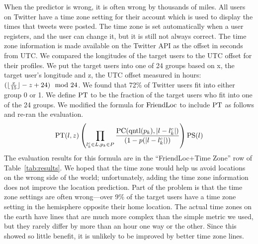 
\ifdefined\THESIS
{}
When the predictor is wrong, it is often wrong by thousands of miles.
%
All users on Twitter have a time zone setting for their account which is used
to display the times that tweets were posted.
%
The time zone is set automatically when a user registers, and the user can
change it, but it is still not always correct.
%
The time zone information is made available on the Twitter API as the offset
in seconds from UTC.
%
We compared the longitudes of the target users to the UTC offset for their
profiles.
%
We put the target users into one of 24 groups based on x, the target user's
longitude and z, the UTC offset measured in hours:
${(\lfloor {x\over15}\rfloor-z+24)\mod{24}}$.
%
We found that 72\% of Twitter users fit into either group 0 or 1.
%
We define $\operatorname{PT}$ to be the fraction of the target users who fit into one
of the 24 groups.
%
We modified the formula for $\operatorname{FriendLoc}$ to include $\operatorname{PT}$ as follows and
re-ran the evaluation.
\[
    \operatorname{PT}(l,z)
    \left(
        \prod_{l^c_k \in L,p_k \in P}
        {\operatorname{PC}(\operatorname{qntl}(p_k),|l-l^c_k|) \over (1-p(|l-l^c_k|))}
    \right)
    \operatorname{PS}(l)
\]
The evaluation results for this formula are in the ``FriendLoc+Time Zone'' row
of Table~\ref{tab:results}.
%
We hoped that the time zone would help us avoid locations on the wrong side of
the world; unfortunately, adding the time zone information does not improve the
location prediction.
%
Part of the problem is that the time zone settings are often wrong---over 9\% of
the target users have a time zone setting in the hemisphere opposite their home
location.
%
The actual time zones on the earth have lines that are much more complex than
the simple metric we used, but they rarely differ by more than an hour one way
or the other.
%
Since this showed so little benefit, it is unlikely to be improved by better
time zone lines.
\fi

